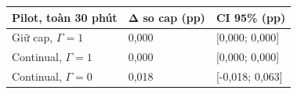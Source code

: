 \par\smallskip\noindent\begin{tabularx}{\linewidth}{@{}P{4cm}XX@{}}\toprule
\textbf{Pilot, toàn 30 phút} & \textbf{Δ so cap (pp)} & \textbf{CI 95\% (pp)} \\
\midrule
Giữ cap, $\Gamma=1$ & 0{,}000 & [0{,}000; 0{,}000] \\
Continual, $\Gamma=1$ & 0{,}000 & [0{,}000; 0{,}000] \\
Continual, $\Gamma=0$ & 0{,}018 & [-0{,}018; 0{,}063] \\
\bottomrule\end{tabularx}\par\smallskip
